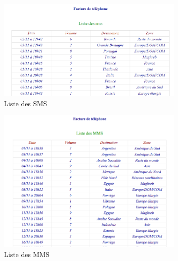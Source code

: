 \begin{figure}[ht]
  \begin{subfigure}{.33\textwidth}
    \centering
    \includegraphics[width=\textwidth]{images/Plateforme/liste_sms_pdf}
    \caption{Liste des SMS}
    \label{fig:liste_sms_pdf}
  \end{subfigure}\hfill%
  \begin{subfigure}{.33\textwidth}
    \centering
    \includegraphics[width=\textwidth]{images/Plateforme/liste_mms_pdf}
    \caption{Liste des MMS}
    \label{fig:liste_mms_pdf}
  \end{subfigure}\hfill
  \begin{subfigure}{.33\textwidth}
    \centering

\end{subfigure}
\end{figure}
